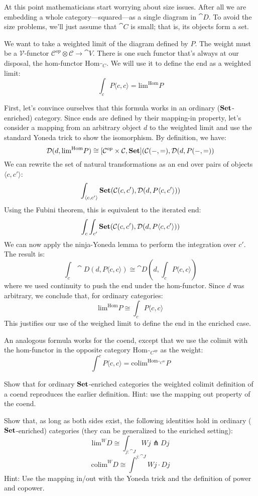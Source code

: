 \documentclass[DaoFP]{subfiles}
\begin{document}
At this point mathematicians start worrying about size issues. After all we are embedding a whole category---squared---as a single diagram in $\cat D$. To avoid the size problems, we'll just assume that $\cat C$ is small; that is, its objects form a set. 

We want to take a weighted limit of the diagram defined by $P$. The weight must be a $\mathcal V$-functor $\mathcal C^{op} \otimes \mathcal C \to \cat V$. There is one such functor that's always at our disposal, the hom-functor $\text{Hom}_{\cat C}$. We will use it to define the end as a weighted limit:
\[  \int_c P\langle c, c\rangle = \text{lim}^{\text{Hom}} P\]

First, let's convince ourselves that this formula works in an ordinary ($\mathbf{Set}$-enriched) category. Since ends are defined by their mapping-in property, let's consider a mapping from an arbitrary object $d$ to the weighted limit and use the standard Yoneda trick to show the isomorphism. By definition, we have:
\[ \mathcal{D}(d, \text{lim}^{\text{Hom}} P) \cong [\mathcal{C}^{op} \times \mathcal{C}, \mathbf{Set}](\mathcal{C}(-, =), \mathcal{D} (d, P(-, =))\]
We can rewrite the set of natural transformations as an end over pairs of objects $\langle c, c' \rangle$:
\[ \int_{\langle c, c' \rangle} \mathbf{Set}(\mathcal{C}(c, c'), \mathcal{D} (d, P\langle c, c' \rangle)) \]
Using the Fubini theorem, this is equivalent to the iterated end:
\[\int_c \int_{c'} \mathbf{Set}(\mathcal{C}(c, c'), \mathcal{D}(d, P\langle c, c' \rangle))\]
We can now apply the ninja-Yoneda lemma to perform the integration over $c'$. The result is:
\[ \int_c \cat D(d, P\langle c, c \rangle) \cong \cat D(d, \int_c P \langle c, c \rangle) \]
where we used continuity to push the end under the hom-functor. Since $d$ was arbitrary, we conclude that, for ordinary categories:
\[ \text{lim}^{\text{Hom}} P \cong  \int_c P\langle c, c\rangle \]
This justifies our use of the weighed limit to define the end in the enriched case.

An analogous formula works for the coend, except that we use the colimit with the hom-functor in the opposite category $\text{Hom}_{\cat C^{op}}$ as the weight:
\[  \int^c P\langle c, c\rangle = \text{colim}^{\text{Hom}_{\cat C^{op}}} P\]

\begin{exercise}
Show that for ordinary $\mathbf{Set}$-enriched categories the weighted colimit definition of a coend reproduces the earlier definition. Hint: use the mapping out property of the coend.
\end{exercise}

\begin{exercise}
Show that, as long as both sides exist, the following identities hold in ordinary ($\mathbf{Set}$-enriched) categories (they can be generalized to the enriched setting):
\[ \text{lim}^W D \cong \int_{j \colon \cat J} W j \pitchfork D j \]
\[ \text{colim}^W D \cong \int^{j \colon \cat J} W j \cdot D j \]
Hint: Use the mapping in/out with the Yoneda trick and the definition of power and copower.
\end{exercise}
\end{document}
